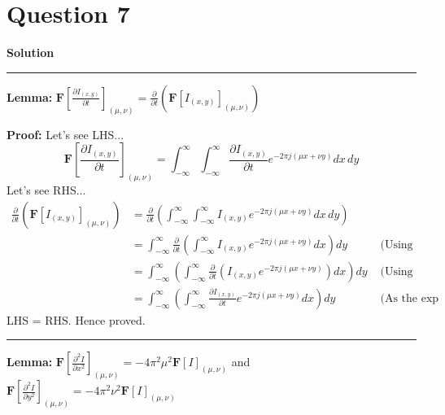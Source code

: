 \documentclass[a4paper]{article}
\title{\cooltitle{CS663 Assignment-3}}
\author{{\bf Saksham Rathi, Kavya Gupta, Shravan Srinivasa Raghavan} \\
\small Department of Computer Science, \\
Indian Institute of Technology Bombay \\}
\date{}
\newenvironment{solution}[2][]{%
    \begin{mdframed}[linecolor=green!60!black, linewidth=2pt, roundcorner=10pt, backgroundcolor=green!5!white, skipabove=12pt, skipbelow=12pt]%
        \textbf{\large #2} %
        \par\noindent\rule{\textwidth}{0.4pt} %
        \vspace{0.5em} %
}{%
    \end{mdframed}%
}
\begin{document}
\maketitle
\section*{Question 7}

\begin{solution}{Solution}
	\textbf{Lemma:} $\mathbf{F} \left[\frac{\partial I_{(x,y)}}{\partial t} \right]_{(\mu, \nu)} = \frac{\partial}{\partial t} (\mathbf{F}[I_{(x,y)}]_{(\mu, \nu)})$
	
	\textbf{Proof:} Let's see LHS...
	\[
		\mathbf{F} \left[\frac{\partial I_{(x,y)}}{\partial t} \right]_{(\mu, \nu)} = \int_{- \infty}^{\infty} \int_{- \infty}^{\infty} \frac{\partial I_{(x,y)}}{\partial t} e^{-2 \pi j (\mu x + \nu y)} dx \, dy
	\]
	Let's see RHS...
	\begin{align*}
		\frac{\partial}{\partial t} (\mathbf{F}[I_{(x,y)}]_{(\mu, \nu)}) &= \frac{\partial}{\partial t} \left( \int_{- \infty}^{\infty} \int_{- \infty}^{\infty} I_{(x,y)} e^{-2 \pi j (\mu x + \nu y)} dx \, dy \right) \\
		&= \int_{- \infty}^{\infty} \frac{\partial}{\partial t} \left( \int_{- \infty}^{\infty} I_{(x,y)} e^{-2 \pi j (\mu x + \nu y)} dx \right) dy &\text{ (Using Newton-Leibniz Formula)} \\
		&= \int_{- \infty}^{\infty} \left( \int_{- \infty}^{\infty} \frac{\partial}{\partial t} \left( I_{(x,y)} e^{-2 \pi j (\mu x + \nu y)} \right) dx \right) dy &\text{ (Using Newton-Leibniz Formula)} \\
		&= \int_{- \infty}^{\infty} \left( \int_{- \infty}^{\infty} \frac{\partial I_{(x,y)}}{\partial t} e^{-2 \pi j (\mu x + \nu y)} dx \right) dy &\text{ (As the exp term is independent from t)}
	\end{align*}
	LHS = RHS. Hence proved.
	\vspace{5pt}
	\hrule
	\vspace{5pt}
	\textbf{Lemma:} $\mathbf{F} \left[\frac{\partial^2 I}{\partial x^2} \right]_{(\mu ,\nu)} = -4 \pi^2 \mu^2 \mathbf{F}[I]_{(\mu ,\nu)}$ and $\mathbf{F} \left[\frac{\partial^2 I}{\partial y^2} \right]_{(\mu ,\nu)} = -4 \pi^2 \nu^2 \mathbf{F}[I]_{(\mu ,\nu)}$


\end{solution}
\end{document}
